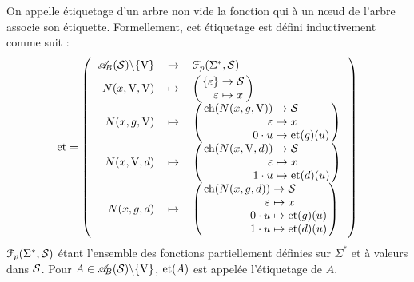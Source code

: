		\colsep{2.2pt}
		\eqskip{3mm}
		\begin{Definition}
			On appelle étiquetage d'un arbre non vide la fonction qui à un n\oe ud de l'arbre associe son étiquette. Formellement, cet étiquetage est défini inductivement comme suit :
				\[
					\et = \left( \begin{tabular}[h]{rcl}
						\(\AB(\cal{S})\backslash\{\V\}\) & \(\rightarrow\) & \(\EuScript{F}_p(\Sigma^*,\cal{S})\) \\[1mm]
						\(\N(x,\V,\V)\) & \(\mapsto\) & \colsep{1.5pt}\(\fun{\{\varepsilon\}}{\cal{S}}{\varepsilon}{x}\) \\
						\(\N(x,g,\V)\) & \(\mapsto\) & \colsep{1.5pt}\(
							\left( \begin{tabular}[h]{rcl}
								\(\ch(N(x,g,\V))\) & \(\to\) & \(\cal{S}\) \\
								\(\varepsilon\) & \(\mapsto\) & \(x\) \\
								\(0\cdot u\) & \(\mapsto\) & \(\et(g)(u)\)
							\end{tabular} \right)
						\) \\
						\(\N(x,\V,d)\) & \(\mapsto\) & \colsep{1.5pt}\(
						\left( \begin{tabular}[h]{rcl}
							\(\ch(N(x,\V,d))\) & \(\to\) & \(\cal{S}\) \\
							\(\varepsilon\) & \(\mapsto\) & \(x\) \\
							\(1\cdot u\) & \(\mapsto\) & \(\et(d)(u)\)
						\end{tabular} \right)
						\) \\
						\(\N(x,g,d)\) & \(\mapsto\) & \colsep{1.5pt}\(
						\left( \begin{tabular}[h]{rcl}
							\(\ch(N(x,g,d))\) & \(\to\) & \(\cal{S}\) \\
							\(\varepsilon\) & \(\mapsto\) & \(x\) \\
							\(0\cdot u\) & \(\mapsto\) & \(\et(g)(u)\) \\
							\(1\cdot u\) & \(\mapsto\) & \(\et(d)(u)\)
						\end{tabular} \right)
						\) \\
					\end{tabular} \right)
				\]
			\(\EuScript{F}_p(\Sigma^*,\cal{S})\) étant l'ensemble des fonctions partiellement définies sur \(\Sigma^*\) et à valeurs dans \(\cal{S}\). \nt
			Pour \(A\in\AB(\cal{S})\backslash\{\V\}\), \(\et(A)\) est appelée l'étiquetage de \(A\).
		\end{Definition}
		
